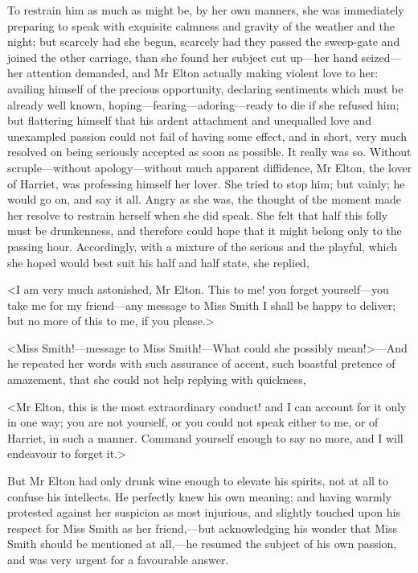 To restrain him as much as might be, by her own manners, she was immediately preparing to speak with exquisite calmness and gravity of the weather and the night; but scarcely had she begun, scarcely had they passed the sweep-gate and joined the other carriage, than she found her subject cut up—her hand seized—her attention demanded, and Mr Elton actually making violent love to her: availing himself of the precious opportunity, declaring sentiments which must be already well known, hoping—fearing—adoring—ready to die if she refused him; but flattering himself that his ardent attachment and unequalled love and unexampled passion could not fail of having some effect, and in short, very much resolved on being seriously accepted as soon as possible. It really was so. Without scruple—without apology—without much apparent diffidence, Mr Elton, the lover of Harriet, was professing himself her lover. She tried to stop him; but vainly; he would go on, and say it all. Angry as she was, the thought of the moment made her resolve to restrain herself when she did speak. She felt that half this folly must be drunkenness, and therefore could hope that it might belong only to the passing hour. Accordingly, with a mixture of the serious and the playful, which she hoped would best suit his half and half state, she replied,

<I am very much astonished, Mr Elton. This to me! you forget yourself—you take me for my friend—any message to Miss Smith I shall be happy to deliver; but no more of this to me, if you please.>

<Miss Smith!—message to Miss Smith!—What could she possibly mean!>—And he repeated her words with such assurance of accent, such boastful pretence of amazement, that she could not help replying with quickness,

<Mr Elton, this is the most extraordinary conduct! and I can account for it only in one way; you are not yourself, or you could not speak either to me, or of Harriet, in such a manner. Command yourself enough to say no more, and I will endeavour to forget it.>

But Mr Elton had only drunk wine enough to elevate his spirits, not at all to confuse his intellects. He perfectly knew his own meaning; and having warmly protested against her suspicion as most injurious, and slightly touched upon his respect for Miss Smith as her friend,—but acknowledging his wonder that Miss Smith should be mentioned at all,—he resumed the subject of his own passion, and was very urgent for a favourable answer.

